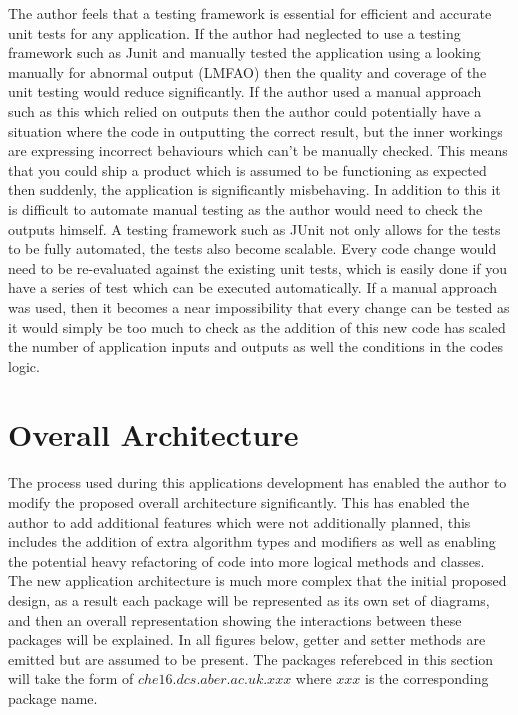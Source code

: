 The author feels that a testing framework is essential for efficient and accurate unit tests for any application. If the author had neglected to use a testing framework such as Junit and manually tested the application using a looking manually for abnormal output (LMFAO) then the quality and coverage of the unit testing would reduce significantly. If the author used a manual approach such as this which relied on outputs then the author could potentially have a situation where the code in outputting the correct result, but the inner workings are expressing incorrect behaviours which can’t be manually checked. This means that you could ship a product which is assumed to be functioning as expected then suddenly, the application is significantly misbehaving. In addition to this it is difficult to automate manual testing as the author would need to check the outputs himself. A testing framework such as JUnit not only allows for the tests to be fully automated, the tests also become scalable. Every code change would need to be re-evaluated against the existing unit tests, which is easily done if you have a series of test which can be executed automatically. If a manual approach was used, then it becomes a near impossibility that every change can be tested as it would simply be too much to check as the addition of this new code has scaled the number of application inputs and outputs as well the conditions in the codes logic.

\section{Overall Architecture}

The process used during this applications development has enabled the author to modify the proposed overall architecture significantly. This has enabled the author to add additional features which were not additionally planned, this includes the addition of extra algorithm types and modifiers as well as enabling the potential heavy refactoring of code into more logical methods and classes. The new application architecture is much more complex that the initial proposed design, as a result each package will be represented as its own set of diagrams, and then an overall representation showing the interactions between these packages will be explained. In all figures below, getter and setter methods are emitted but are assumed to be present. The packages referebced in this section will take the form of $che16.dcs.aber.ac.uk.xxx$ where $xxx$ is the corresponding package name.

